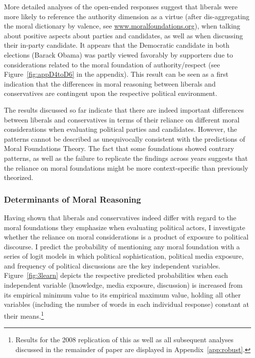 \documentclass[12pt]{article}
\begin{document}
More detailed analyses of the open-ended responses suggest that liberals were more likely to reference the authority dimension as a virtue (after dis-aggregating the moral dictionary by valence, see \url{www.moralfoundations.org}), when talking about positive aspects about parties and candidates, as well as when discussing their in-party candidate. It appears that the Democratic candidate in both elections (Barack Obama) was partly viewed favorably by supporters due to considerations related to the moral foundation of authority/respect (see Figure~\ref{fig:appD4toD6} in the appendix). This result can be seen as a first indication that the differences in moral reasoning between liberals and conservatives are contingent upon the respective political environment.

The results discussed so far indicate that there are indeed important differences between liberals and conservatives in terms of their reliance on different moral considerations when evaluating political parties and candidates. However, the patterns cannot be described as unequivocally consistent with the predictions of Moral Foundations Theory. The fact that some foundations showed contrary patterns, as well as the failure to replicate the findings across years suggests that the reliance on moral foundations might be more context-specific than previously theorized.


\subsubsection{Determinants of Moral Reasoning}

Having shown that liberals and conservatives indeed differ with regard to the moral foundations they emphasize when evaluating political actors, I investigate whether the reliance on moral considerations is a product of exposure to political discourse. I predict the probability of mentioning any moral foundation with a series of logit models in which political sophistication, political media exposure, and frequency of political discussions are the key independent variables. Figure~\ref{fig:3learn} depicts the respective predicted probabilities when each independent variable (knowledge, media exposure, discussion) is increased from its empirical minimum value to its empirical maximum value, holding all other variables (including the number of words in each individual response) constant at their means.\footnote{Results for the 2008 replication of this as well as all subsequent analyses discussed in the remainder of paper are displayed in Appendix~\ref{app:robust}.}
\end{document}
